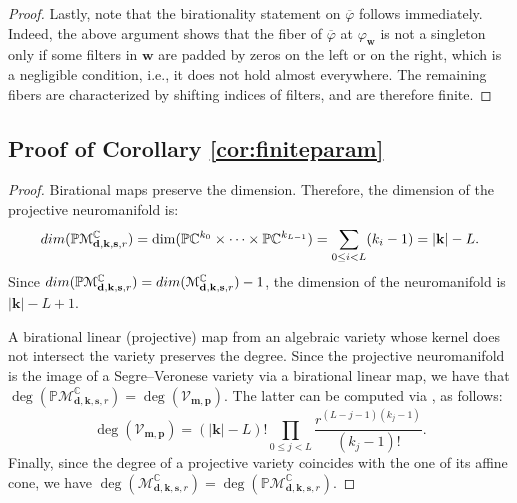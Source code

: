 \documentclass[twoside]{article}
\theoremstyle{plain}%
\theoremstyle{definition}
\theoremstyle{remark}
\begin{document}
\begin{proof}
Lastly, note that the birationality statement on $\overline{\varphi}$ follows immediately. Indeed, the above argument shows that the fiber of $\overline{\varphi}$ at $\varphi_{\mathbf{w}}$ is not a singleton only if some filters in $\mathbf{w}$ are padded by zeros on the left or on the right, which is a negligible condition, i.e., it does not hold almost everywhere. The remaining fibers are characterized by shifting indices of filters, and are therefore finite. 
\end{proof} 



\subsection{Proof of Corollary \ref{cor:finiteparam}}\label{app:finiteparam}
\begin{proof}
Birational maps preserve the dimension. Therefore, the dimension of the projective neuromanifold is:
\begin{equation}
\textnormal{dim}(\mathbb{P}\mathcal{M}_{\mathbf{d}, \mathbf{k}, \mathbf{s}, r}^\mathbb{C}) = \dim (\mathbb{P} \mathbb{C}^{k_0} \times \cdots \times \mathbb{P} \mathbb{C}^{k_{L-1}}) = \sum_{0 \leq i < L} (k_i - 1) = |\mathbf{k}| - L.
\end{equation}
  Since $\textnormal{dim}(\mathbb{P}\mathcal{M}_{\mathbf{d}, \mathbf{k}, \mathbf{s}, r}^\mathbb{C}) = \textnormal{dim}(\mathcal{M}_{\mathbf{d}, \mathbf{k}, \mathbf{s}, r}^\mathbb{C}) -1$,  the dimension of the neuromanifold is $|\mathbf{k}| - L + 1$.

A birational linear (projective) map from an algebraic variety whose kernel does not intersect the variety preserves the degree. Since the projective neuromanifold is the image of a Segre--Veronese variety via a birational linear map, we have that $\deg(\mathbb{P}\mathcal{M}_{\mathbf{d}, \mathbf{k}, \mathbf{s}, r}^\mathbb{C}) = \deg(\mathcal{V}_{\mathbf{m}, \mathbf{p}})$. The latter can be computed via  \cite[Proposition 6.11]{kozhasov2023minimal}, as follows:
\begin{equation}
    \label{eq:deg_neuro}
    \deg(\mathcal{V}_{\mathbf{m}, \mathbf{p}}) = (|\mathbf{k}|-L)!\prod_{0 \leq j < L} \frac{r^{(L - j - 1)(k_j - 1)}}{(k_j - 1)!}.
\end{equation}
Finally, since the degree of a projective variety coincides with the one of its affine cone, we have $\deg(\mathcal{M}_{\mathbf{d}, \mathbf{k}, \mathbf{s}, r}^\mathbb{C}) = \deg(\mathbb{P}\mathcal{M}_{\mathbf{d}, \mathbf{k}, \mathbf{s}, r}^\mathbb{C})$. 
\end{proof}
\end{document}
